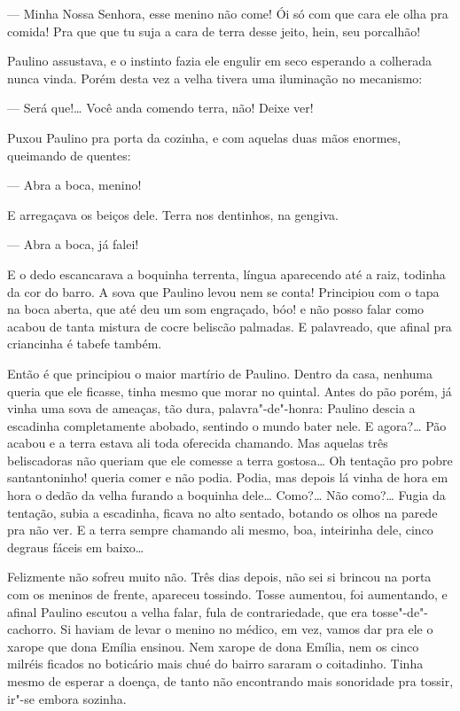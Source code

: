 \begin{linenumbers}
--- Minha Nossa Senhora, esse menino não come! Ói só com que cara ele
olha pra comida! Pra que que tu suja a cara de terra desse jeito, hein,
seu porcalhão!

Paulino assustava, e o instinto fazia ele engulir em seco esperando a
colherada nunca vinda. Porém desta vez a velha tivera uma iluminação no
mecanismo:

--- Será que!\ldots{} Você anda comendo terra, não! Deixe ver!

Puxou Paulino pra porta da cozinha, e com aquelas duas mãos enormes,
queimando de quentes:

--- Abra a boca, menino!

E arregaçava os beiços dele. Terra nos dentinhos, na gengiva.

--- Abra a boca, já falei!

E o dedo escancarava a boquinha terrenta, língua aparecendo até a raiz,
todinha da cor do barro. A sova que Paulino levou nem se conta!
Principiou com o tapa na boca aberta, que até deu um som engraçado, bóo!
e não posso falar como acabou de tanta mistura de cocre beliscão
palmadas. E palavreado, que afinal pra criancinha é tabefe também.

Então é que principiou o maior martírio de Paulino. Dentro da casa,
nenhuma queria que ele ficasse, tinha mesmo que morar no quintal. Antes
do pão porém, já vinha uma sova de ameaças, tão dura, palavra"-de"-honra:
Paulino descia a escadinha completamente abobado, sentindo o mundo bater
nele. E agora?\ldots{} Pão acabou e a terra estava ali toda oferecida
chamando. Mas aquelas três beliscadoras não queriam que ele comesse a
terra gostosa\ldots{} Oh tentação pro pobre santantoninho! queria comer e não
podia. Podia, mas depois lá vinha de hora em hora o dedão da velha
furando a boquinha dele\ldots{} Como?\ldots{} Não como?\ldots{} Fugia da tentação,
subia a escadinha, ficava no alto sentado, botando os olhos na parede
pra não ver. E a terra sempre chamando ali mesmo, boa, inteirinha dele,
cinco degraus fáceis em baixo\ldots{}

Felizmente não sofreu muito não. Três dias depois, não sei si brincou na
porta com os meninos de frente, apareceu tossindo. Tosse aumentou, foi
aumentando, e afinal Paulino escutou a velha falar, fula de
contrariedade, que era tosse"-de"-cachorro. Si haviam de levar o menino no
médico, em vez, vamos dar pra ele o xarope que dona Emília ensinou. Nem
xarope de dona Emília, nem os cinco milréis ficados no boticário mais
chué do bairro sararam o coitadinho. Tinha mesmo de esperar a doença, de
tanto não encontrando mais sonoridade pra tossir, ir"-se embora sozinha.


\end{linenumbers}
